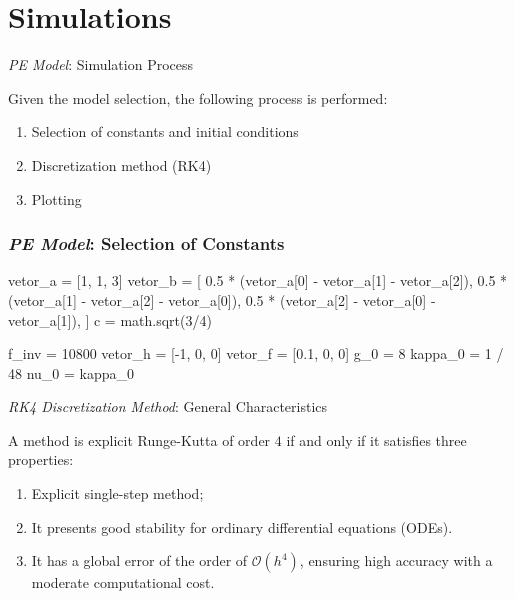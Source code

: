\section{Simulations}


\begin{frame}{\textit{PE Model}: Simulation Process}
	
	Given the model selection, the following process is performed:
	
	\begin{enumerate}
		\item Selection of constants and initial conditions
		\item Discretization method (RK4)
		\item Plotting
	\end{enumerate}
\end{frame}

\begin{frame}[fragile]
		
	\frametitle{\textit{PE Model}: Selection of Constants}
		    
	\begin{python}
		vetor_a = [1, 1, 3]
		vetor_b = [
			0.5 * (vetor_a[0] - vetor_a[1] - vetor_a[2]),
			0.5 * (vetor_a[1] - vetor_a[2] - vetor_a[0]),
			0.5 * (vetor_a[2] - vetor_a[0] - vetor_a[1]),
		]
		c = math.sqrt(3/4)
				
		f_inv = 10800
		vetor_h = [-1, 0, 0]
		vetor_f = [0.1, 0, 0]
		g_0 = 8
		kappa_0 = 1 / 48
		nu_0 = kappa_0
	\end{python}
\end{frame}


\begin{frame}{\textit{RK4 Discretization Method}: General Characteristics}
	
	A method is explicit Runge-Kutta of order $4$ if and only if it satisfies three properties:
	\begin{enumerate}
		\item Explicit single-step method;
		\item It presents good stability for ordinary differential equations (ODEs).
		\item It has a global error of the order of $\mathcal{O}(h^4)$, ensuring high accuracy with a moderate computational cost.
	\end{enumerate}
\end{frame}

